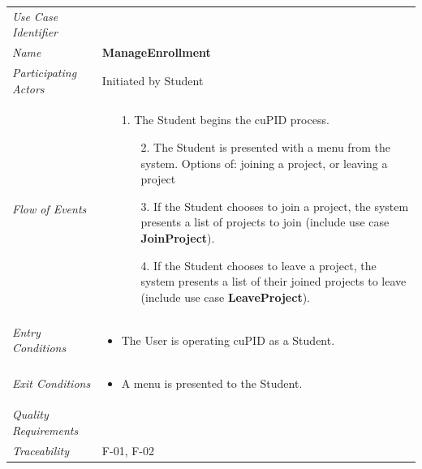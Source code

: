 \documentclass[12pt,letterpaper]{article}
\begin{document}
\begin{center}
	\begin{tabu} to 
		\toprule
		Use Case Identifier & \manageenrollment{} \\
		Name & {\bf ManageEnrollment} \\
		Participating Actors & Initiated by Student \\
		Flow of Events & 
		\begin{minipage}[t]{\linewidth}
		    \begin{enumerate}
			    \item[1.] The Student begins the cuPID process.
			    \begin{enumerate}
					\item[2.] The Student is presented with a menu from the system. Options of: joining a project, or leaving a project
					\item[3.] If the Student chooses to join a project, the system presents a list of projects to join (include use case \textbf{JoinProject}).
					\item[4.] If the Student chooses to leave a project, the system presents a list of their joined projects to leave (include use case \textbf{LeaveProject}).
				\end{enumerate}
	        \end{enumerate}
		\end{minipage} \\

		Entry Conditions &
		\begin{minipage}[t]{\linewidth}
			\begin{itemize}
			    \item The User is operating cuPID as a Student.
	        \end{itemize}
		\end{minipage} \\

		Exit Conditions &
		\begin{minipage}[t]{\linewidth}
			\begin{itemize}
			    \item A menu is presented to the Student.
	        \end{itemize}
		\end{minipage} \\

		Quality Requirements & \\

		Traceability & F-01, F-02\\
		\toprule
	\end{tabu}
\end{center}
\end{document}

